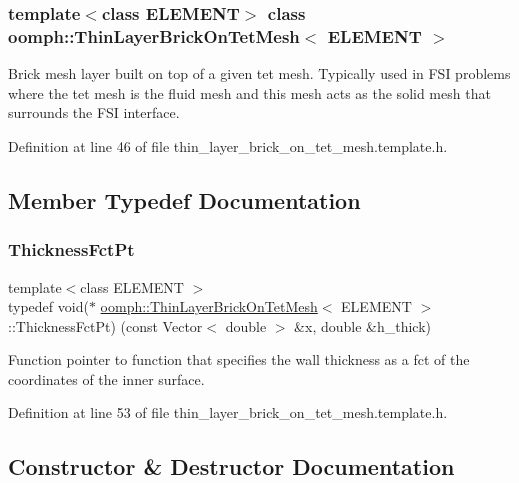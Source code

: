 \subsubsection*{template$<$class E\+L\+E\+M\+E\+NT$>$\newline
class oomph\+::\+Thin\+Layer\+Brick\+On\+Tet\+Mesh$<$ E\+L\+E\+M\+E\+N\+T $>$}

Brick mesh layer built on top of a given tet mesh. Typically used in F\+SI problems where the tet mesh is the fluid mesh and this mesh acts as the solid mesh that surrounds the F\+SI interface. 

Definition at line 46 of file thin\+\_\+layer\+\_\+brick\+\_\+on\+\_\+tet\+\_\+mesh.\+template.\+h.



\subsection{Member Typedef Documentation}
\mbox{\label{classoomph_1_1ThinLayerBrickOnTetMesh_aed34f7d1e9a5c6b5f3e220cb5bdf4550}} 
\subsubsection{\texorpdfstring{Thickness\+Fct\+Pt}{ThicknessFctPt}}
{\footnotesize\ttfamily template$<$class E\+L\+E\+M\+E\+NT $>$ \\
typedef void($\ast$ \hyperlink{classoomph_1_1ThinLayerBrickOnTetMesh}{oomph\+::\+Thin\+Layer\+Brick\+On\+Tet\+Mesh}$<$ E\+L\+E\+M\+E\+NT $>$\+::Thickness\+Fct\+Pt) (const Vector$<$ double $>$ \&x, double \&h\+\_\+thick)}



Function pointer to function that specifies the wall thickness as a fct of the coordinates of the inner surface. 



Definition at line 53 of file thin\+\_\+layer\+\_\+brick\+\_\+on\+\_\+tet\+\_\+mesh.\+template.\+h.



\subsection{Constructor \& Destructor Documentation}
\mbox{\label{classoomph_1_1ThinLayerBrickOnTetMesh_ad452469bc94bff203012e68e80ee543c}} 
